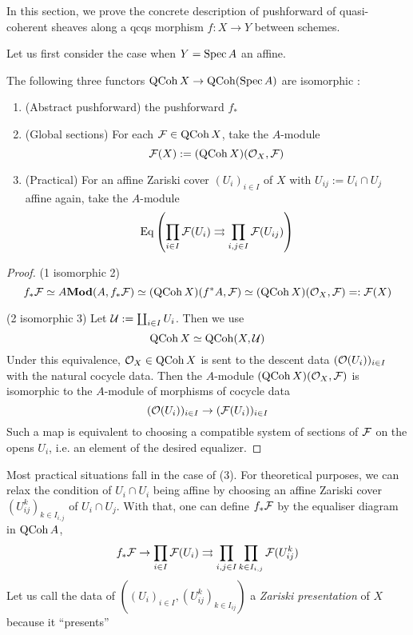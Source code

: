 \documentclass[./main.tex]{subfiles}
\begin{document}
In this section,
we prove the concrete description of pushforward
of quasi-coherent sheaves along a qcqs morphism $f : X \to Y$ between schemes.

Let us first consider the case when $Y = \operatorname{Spec} A$ an affine.
\begin{prop}
  
  The following three functors $\operatorname{QCoh} X \to \operatorname{QCoh}(\operatorname{Spec} A)$ are isomorphic : 
  \begin{enumerate}
    \item (Abstract pushforward) the pushforward $f_*$
    \item (Global sections) For each $\mathcal{F} \in \operatorname{QCoh} X$,
    take the $A$-module \[
      \mathcal{F}(X) := (\operatorname{QCoh} X)(\mathcal{O}_X , \mathcal{F})
    \]
    \item (Practical) For an affine Zariski cover $(U_i)_{i \in I}$ of $X$
    with $U_{ij} := U_i \cap U_j$ affine again,
    take the $A$-module \[
      \mathrm{Eq}\left(
        \prod_{i \in I} \mathcal{F}(U_i) \rightrightarrows
        \prod_{i , j \in I} \mathcal{F}(U_{i j})
      \right)  
    \]
  \end{enumerate}
\end{prop}
\begin{proof}
  (1 isomorphic 2)
  \[
    f_* \mathcal{F} \simeq
    A\mathbf{Mod}(A , f_* \mathcal{F}) \simeq 
    (\operatorname{QCoh} X)(f^* A , \mathcal{F}) \simeq
    (\operatorname{QCoh} X)(\mathcal{O}_X , \mathcal{F}) =: \mathcal{F}(X)
  \]

  (2 isomorphic 3)
  Let $\mathcal{U} := \coprod_{i \in I} U_i$.
  Then we use \[
    \operatorname{QCoh} X \simeq \operatorname{QCoh} (X , \mathcal{U})  
  \]
  Under this equivalence,
  $\mathcal{O}_X \in \operatorname{QCoh} X$ is sent to
  the descent data $(\mathcal{O}(U_i))_{i \in I}$
  with the natural cocycle data.
  Then the $A$-module $(\operatorname{QCoh} X)(\mathcal{O}_X , \mathcal{F})$
  is isomorphic to
  the $A$-module of morphisms of cocycle data \[
    (\mathcal{O}(U_i))_{i \in I} \to (\mathcal{F}(U_i))_{i \in I}  
  \]
  Such a map is equivalent to
  choosing a compatible system of sections of $\mathcal{F}$
  on the opens $U_i$,
  i.e. an element of the desired equalizer.
\end{proof}
Most practical situations fall in the case of (3).
For theoretical purposes,
we can relax the condition of $U_i \cap U_i$ being affine 
by choosing an affine Zariski cover $(U_{i j}^k)_{k \in I_{i,j}}$ 
of $U_i \cap U_j$.
With that, one can define $f_*\mathcal{F}$ by the equaliser diagram in
$\operatorname{QCoh} A$, 
\[
  f_* \mathcal{F} \to \prod_{i \in I} \mathcal{F}(U_i) \rightrightarrows
  \prod_{i , j \in I} \prod_{k \in I_{i, j}} \mathcal{F}(U_{ij}^k)
\]
Let us call the data of $((U_i)_{i \in I} , (U_{ij}^k)_{k \in I_{ij}})$
a \emph{Zariski presentation} of $X$ because it ``presents''
\end{document}
